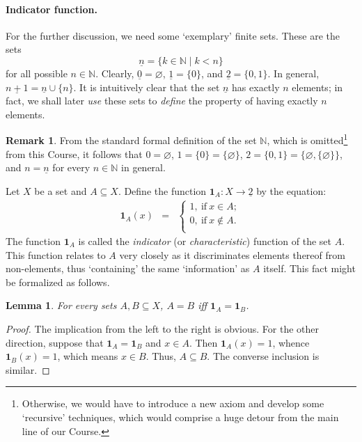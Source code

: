 \documentclass[12pt,notitlepage]{article}
\theoremstyle{plain}
\newtheorem{lemma}[thm]{Lemma}
\theoremstyle{definition}
\newtheorem{rem}[thm]{Remark}
\theoremstyle{plain}
\newcommand{\N}{\mathbb{N}}
\newcommand{\sbs}{\subseteq}
\newcommand{\void}{\varnothing}
\newcommand{\ul}[1]{\underline{#1}}
\newcommand{\1}{\mathbf{1}}
\newcommand{\0}{\mathbf{0}}
\newcommand{\mcomm}[1]{}
\begin{document}
\paragraph{Indicator function.} For the further discussion, we need some `exemplary' finite sets. These are the sets
$$\ul{n} = \{ k \in \N \mid k < n \}$$
for all possible $n \in \N$. Clearly, $\ul{0} = \void$, $\ul{1} = \{0\}$, and $\ul{2} = \{0, 1\}$. In general, $\ul{n + 1} = \ul{n} \cup \{ n \}$. It is intuitively clear that the set $\ul{n}$ has exactly $n$ elements; in fact, we shall later \emph{use} these sets to \emph{define} the property of having exactly $n$ elements.

\begin{rem}
From the standard formal definition of the set $\N$, which is omitted\footnote{Otherwise, we would have to introduce a new axiom and develop some `recursive' techniques, which would comprise a huge detour from the main line of our Course.} from this Course, it follows that $0 = \void$, $1 = \{0\} = \{ \void \}$, $2 = \{0, 1\} = \{ \void, \{\void\} \}$, and $n = \ul{n}$ for every $n \in \N$ in general.
\end{rem}
\mcomm{We usually ask students not to use the inner structure of naturals in any argument since this has not been ``officially'' defined in our Course.}

Let $X$ be a set and $A \sbs X$. Define the function $\1_A \colon X \to \ul{2}$ by the equation:
$$
\begin{array}{rcl}
\1_A(x) &=& \begin{cases}
1,\ \mbox{if}\ x \in A;\\
0,\ \mbox{if}\ x \notin A.\\
\end{cases}
\end{array}
$$
The function $\1_A$ is called the \emph{indicator} (or \emph{characteristic}) function of the set $A$. This function relates to $A$ very closely as it discriminates elements thereof from non-elements, thus `containing' the same `information' as $A$ itself. This fact might be formalized as follows.
\begin{lemma}\label{L9:char1}
For every sets $A, B \sbs X$, $A = B$ iff $\1_A = \1_B$.
\end{lemma}
\begin{proof}
The implication from the left to the right is obvious. For the other direction, suppose that $\1_A = \1_B$ and $x \in A$. Then $\1_A(x) = 1$, whence $\1_B(x) = 1$, which means $x \in B$. Thus, $A \sbs B$. The converse inclusion is similar.
\end{proof}
\end{document}
